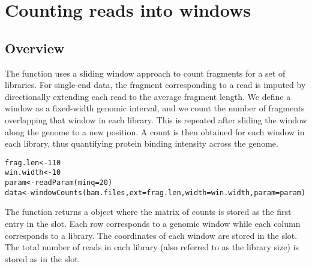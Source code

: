 \documentclass{report}\usepackage[]{graphicx}\usepackage[usenames,dvipsnames]{color}
\newcommand{\hlnum}[1]{\textcolor[rgb]{0.816,0.125,0.439}{#1}}%
\newcommand{\hlstd}[1]{\textcolor[rgb]{0.251,0.251,0.251}{#1}}%
\newcommand{\hlkwb}[1]{\textcolor[rgb]{0,0,0}{#1}}%
\newcommand{\hlkwc}[1]{\textcolor[rgb]{0.251,0.251,0.251}{#1}}%
\newcommand{\hlkwd}[1]{\textcolor[rgb]{0.878,0.439,0.125}{#1}}%
\newenvironment{knitrout}{}{} %
\begin{document}
\section{Counting reads into windows}

\subsection{Overview}
The  function uses a sliding window approach to count fragments for a set of libraries. 
For single-end data, the fragment corresponding to a read is imputed by directionally extending each read to the average fragment length. 
We define a window as a fixed-width genomic interval, and we count the number of fragments overlapping that window in each library.
This is repeated after sliding the window along the genome to a new position. 
A count is then obtained for each window in each library, thus quantifying protein binding intensity across the genome.

\begin{knitrout}
\color{fgcolor}\begin{kframe}
\begin{alltt}
\hlstd{frag.len} \hlkwb{<-} \hlnum{110}
\hlstd{win.width} \hlkwb{<-} \hlnum{10}
\hlstd{param} \hlkwb{<-} \hlkwd{readParam}\hlstd{(}\hlkwc{minq}\hlstd{=}\hlnum{20}\hlstd{)}
\hlstd{data} \hlkwb{<-} \hlkwd{windowCounts}\hlstd{(bam.files,} \hlkwc{ext}\hlstd{=frag.len,} \hlkwc{width}\hlstd{=win.width,} \hlkwc{param}\hlstd{=param)}
\end{alltt}
\end{kframe}
\end{knitrout}

The function returns a  object where the matrix of counts is stored as the first entry in the  slot.
Each row corresponds to a genomic window while each column corresponds to a library.
The coordinates of each window are stored in the  slot.
The total number of reads in each library (also referred to as the library size) is stored as  in the  slot.
\end{document}
